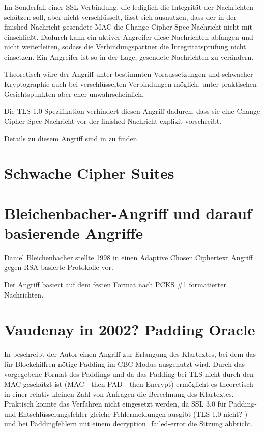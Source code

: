 \documentclass[
    12pt,
    headings=small,
    parskip=half,           %
    bibliography=totoc,
    numbers=noenddot,       %
    open=any,               %
    ]{scrreprt}
\newcommand{\finished}				{finished}
\newcommand{\changecipherspec}	{Change Cipher Spec}
\begin{document}
Im Sonderfall einer SSL-Verbindung, die lediglich die Integrität der Nachrichten schützen soll, aber nicht verschlüsselt, lässt sich ausnutzen, dass der in der \finished{}-Nachricht gesendete MAC die \changecipherspec{}-Nachricht nicht mit einschließt. Dadurch kann ein aktiver Angreifer diese Nachrichten abfangen und nicht weiterleiten, sodass die Verbindungspartner die Integritätsprüfung nicht einsetzen. Ein Angreifer ist so in der Lage, gesendete Nachrichten zu verändern. 

Theoretisch wäre der Angriff unter bestimmten Voraussetzungen und schwacher Kryptographie auch bei verschlüsselten Verbindungen möglich, unter praktischen Gesichtspunkten aber eher unwahrscheinlich.

Die TLS 1.0-Spezifikation verhindert diesen Angriff dadurch, dass sie eine \changecipherspec{}-Nachricht vor der \finished{}-Nachricht explizit vorschreibt.

Details zu diesem Angriff sind in \cite{wagner96} zu finden.

\section{Schwache Cipher Suites}

\section{Bleichenbacher-Angriff und darauf basierende Angriffe}

Daniel Bleichenbacher stellte 1998 in \cite{bleichenbacher98} einen Adaptive Chosen Ciphertext Angriff gegen RSA-basierte Protokolle vor.

Der Angriff basiert auf dem festen Format nach PCKS \#1 formatierter Nachrichten. 

\section{Vaudenay in 2002? Padding Oracle}

In \cite{vaudenay02} beschreibt der Autor einen Angriff zur Erlangung des Klartextes, bei dem das für Blockchiffren nötige Padding im CBC-Modus ausgenutzt wird. Durch das vorgegebene Format des Paddings und da das Padding bei TLS nicht durch den MAC geschützt ist (MAC - then PAD - then Encrypt) ermöglicht es theoretisch in einer relativ kleinen Zahl von Anfragen die Berechnung des Klartextes. Praktisch konnte das Verfahren nicht eingesetzt werden, da SSL 3.0 für Padding- und Entschlüsselungsfehler gleiche Fehlermeldungen ausgibt (TLS 1.0 nicht? ) und bei Paddingfehlern mit einem decryption\_failed-error die Sitzung abbricht.
\end{document}
